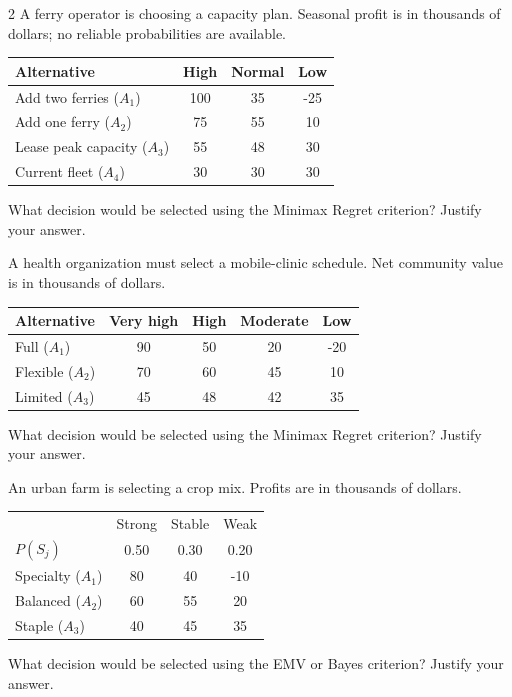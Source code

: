 \begin{multicols}{2}
		A ferry operator is choosing a capacity plan. Seasonal profit is in thousands of dollars; no reliable probabilities are available.
		\begin{center}\setlength{\tabcolsep}{2pt}\renewcommand{\arraystretch}{1.15}
			\begin{tabular}{lccc}\toprule
			Alternative & High & Normal & Low\\ \midrule
			Add two ferries ($A_1$)&100&35&-25\\
			Add one ferry ($A_2$)&75&55&10\\
			Lease peak capacity ($A_3$)&55&48&30\\
			Current fleet ($A_4$)&30&30&30\\ \bottomrule
			\end{tabular}
		\end{center}\vspace{-3mm}
		What decision would be selected using the Minimax Regret criterion? Justify your answer.
		
		\columnbreak

		A health organization must select a mobile-clinic schedule. Net community value is in thousands of dollars.
		\begin{center}\setlength{\tabcolsep}{2pt}\renewcommand{\arraystretch}{1.15}
			\begin{tabular}{lcccc}\toprule
			Alternative & Very high & High & Moderate & Low\\ \midrule
			Full ($A_1$)&90&50&20&-20\\
			Flexible ($A_2$)&70&60&45&10\\
			Limited ($A_3$)&45&48&42&35\\ \bottomrule
			\end{tabular}
		\end{center}\vspace{-3mm}
		What decision would be selected using the Minimax Regret criterion? Justify your answer.

		An urban farm is selecting a crop mix. Profits are in thousands of dollars.
		\begin{center}\setlength{\tabcolsep}{2pt}\renewcommand{\arraystretch}{1.15}
			\begin{tabular}{lccc}\toprule
			&Strong&Stable&Weak\\
			$P(S_j)$&0.50&0.30&0.20\\ \midrule
			Specialty ($A_1$)&80&40&-10\\
			Balanced ($A_2$)&60&55&20\\
			Staple ($A_3$)&40&45&35\\ \bottomrule
			\end{tabular}
		\end{center}\vspace{-3mm}
		What decision would be selected using the EMV or Bayes criterion? Justify your answer.


\end{multicols}

